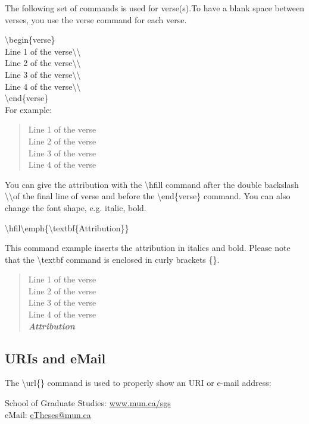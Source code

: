 \documentclass[12pt]{MUNThesisBibTeX}
\begin{document}
The following set of commands is used for verse(s).To have a blank space between verses, you use the verse command for each verse.

\medskip

\textbackslash begin\{verse\}\\
Line 1 of the verse\textbackslash\textbackslash\\
Line 2 of the verse\textbackslash\textbackslash\\
Line 3 of the verse\textbackslash\textbackslash\\
Line 4 of the verse\textbackslash\textbackslash\\
\textbackslash end\{verse\}\\

For example:

\begin{verse}
Line 1 of the verse\\
Line 2 of the verse\\
Line 3 of the verse\\
Line 4 of the verse\\
\end{verse}

You can give the attribution with the \textbackslash hfill command after the double backslash \textbackslash\textbackslash  of the final line of verse and before the \textbackslash end\{verse\} command. You can also change the font shape, e.g. italic, bold.

\textbackslash hfil\textbackslash emph\{\textbackslash textbf\{Attribution\}\}

This command example inserts the attribution in italics and bold. Please note that the \textbackslash textbf command is enclosed in curly brackets \{\}.

\begin{verse}
Line 1 of the verse\\
Line 2 of the verse\\
Line 3 of the verse\\
Line 4 of the verse\\\hfill\textit{\textbf{Attribution}}
\end{verse}

\subsection{URIs and eMail}
The \textbackslash url\{\} command is used to properly show an URI or e-mail address:

School of Graduate Studies: \url{www.mun.ca/sgs}\\
eMail: \url{eTheses@mun.ca}
\end{document}
